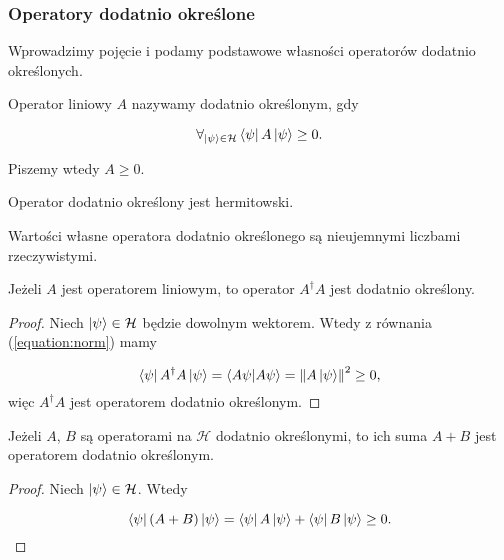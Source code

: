 \subsubsection{Operatory dodatnio określone}

Wprowadzimy pojęcie i podamy podstawowe własności operatorów dodatnio określonych.

\begin{definition}
    \label{definition:semidefinite}
    Operator liniowy $A$ nazywamy dodatnio określonym, gdy

    $$
        \forall_{\ket{\psi} \in \mathcal{H}} \bra{\psi} A \ket{\psi} \geq 0.
    $$

    Piszemy wtedy $A \geq 0$.
\end{definition}

\begin{theorem}
    \label{theorem:positive}
    Operator dodatnio określony jest hermitowski.
\end{theorem}

\begin{theorem}
    \label{theorem:positivevalues}
    Wartości własne operatora dodatnio określonego są nieujemnymi liczbami rzeczywistymi.
\end{theorem}

\begin{theorem}
    \label{theorem:adaga}
    Jeżeli $A$ jest operatorem liniowym, to operator $A ^ {\dag} A$ jest dodatnio określony.
\end{theorem}

\begin{proof}
    Niech $\ket{\psi} \in \mathcal{H}$ będzie dowolnym wektorem. Wtedy z równania (\ref{equation:norm}) mamy

    $$
        \bra{\psi} A ^ {\dag} A \ket{\psi} = \bra{A \psi}\ket{A \psi}=\left\|A \ket{\psi}\right\|^2 \geq 0,
    $$
    więc $A ^ {\dag} A$ jest operatorem dodatnio określonym.
\end{proof}

\begin{theorem}
    Jeżeli $A$, $B$ są operatorami na $\mathcal{H}$ dodatnio określonymi, to ich suma $A + B$ jest operatorem dodatnio określonym.
\end{theorem}

\begin{proof}
    Niech $\ket{\psi} \in \mathcal{H}$. Wtedy

    $$
        \bra{\psi} (A + B) \ket{\psi}=\bra{\psi} A \ket{\psi} + \bra{\psi} B \ket{\psi} \geq 0.
    $$
\end{proof}

